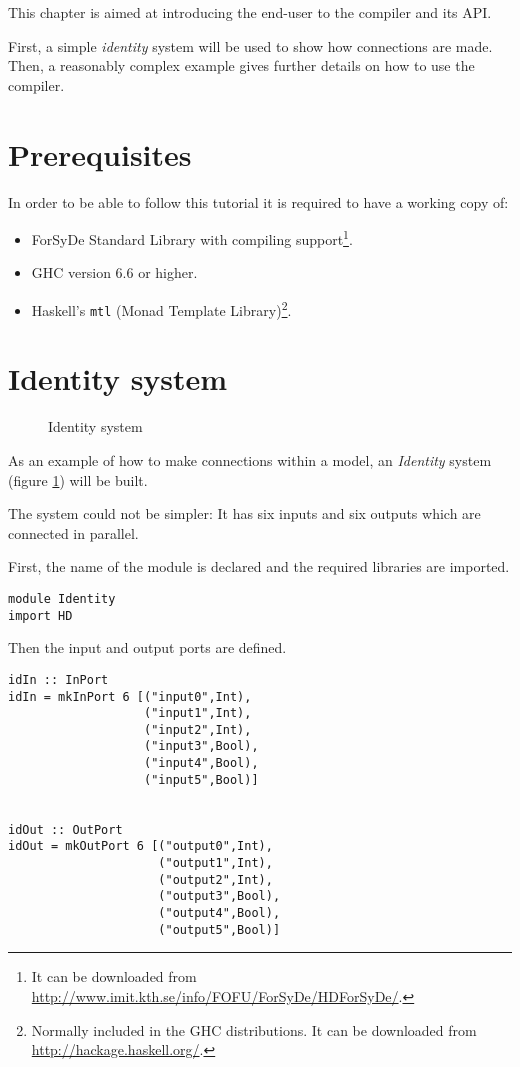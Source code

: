 This chapter is aimed at introducing the end-user to the compiler
and its API.

First, a simple \textit{identity} system will be used to show how
connections are made. Then, a reasonably complex example gives further
details on how to use the compiler.

\section{Prerequisites}

In order to be able to follow this tutorial it is required to have a
working copy of:

\begin{itemize}
\item ForSyDe Standard Library with compiling support\footnote{It can be
  downloaded from
  \url{http://www.imit.kth.se/info/FOFU/ForSyDe/HDForSyDe/}.}.
\item GHC version 6.6 or higher.
\item Haskell's \texttt{mtl} (Monad Template
  Library)\footnote{Normally included in the GHC distributions. It can
    be downloaded from \url{http://hackage.haskell.org/}.}.
\end{itemize}

\section{Identity system}

\begin{figure}
\centering

  \caption{Identity system}
  \label{fig:identity}
\end{figure}

As an example of how to make connections within a model, an
\textit{Identity} system (figure \ref{fig:identity}) will be built.

The system could not be simpler: It has six inputs and six outputs
which are connected in parallel.


First, the name of the module is declared and the required libraries
are imported.

\begin{lstlisting}
module Identity
import HD
\end{lstlisting}

Then the input and output ports are defined.

\begin{lstlisting}
idIn :: InPort
idIn = mkInPort 6 [("input0",Int),
                   ("input1",Int),
                   ("input2",Int),
                   ("input3",Bool),
                   ("input4",Bool),
                   ("input5",Bool)]


idOut :: OutPort
idOut = mkOutPort 6 [("output0",Int),
                     ("output1",Int),
                     ("output2",Int),
                     ("output3",Bool),
                     ("output4",Bool),
                     ("output5",Bool)]
\end{lstlisting}

